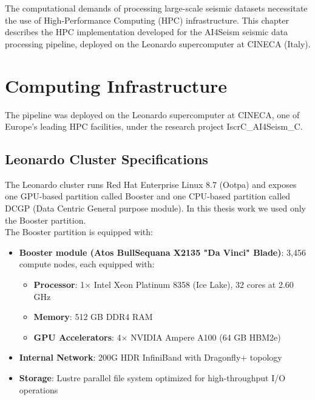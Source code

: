 \label{chap:hpc}

The computational demands of processing large-scale seismic datasets
necessitate the use of High-Performance Computing (HPC) infrastructure. This
chapter describes the HPC implementation developed for the AI4Seism seismic
data processing pipeline, deployed on the Leonardo supercomputer at CINECA
(Italy).

\section{Computing Infrastructure}

The pipeline was deployed on the Leonardo supercomputer at CINECA, one of
Europe's leading HPC facilities, under the research project IscrC\_AI4Seism\_C.

\subsection{Leonardo Cluster Specifications}
The Leonardo cluster runs Red Hat Enterprise Linux 8.7 (Ootpa) and exposes one
GPU-based partition called Booster and one CPU-based partition called DCGP
(Data Centric General purpose module). In this thesis work we used only the
Booster partition.\\

The Booster partition is equipped with:
\begin{itemize}
  \item \textbf{Booster module (Atos BullSequana X2135 "Da Vinci" Blade)}:
    3,456 compute nodes, each equipped with:
    \begin{itemize}
      \item \textbf{Processor}: 1$\times$ Intel Xeon Platinum 8358
        (Ice Lake), 32
        cores at 2.60 GHz
      \item \textbf{Memory}: 512 GB DDR4 RAM
      \item \textbf{GPU Accelerators}: 4$\times$ NVIDIA Ampere A100
        (64 GB HBM2e)
    \end{itemize}

  \item \textbf{Internal Network}: 200G HDR InfiniBand with Dragonfly+ topology

  \item \textbf{Storage}: Lustre parallel file system optimized for
    high-throughput I/O operations
\end{itemize}

